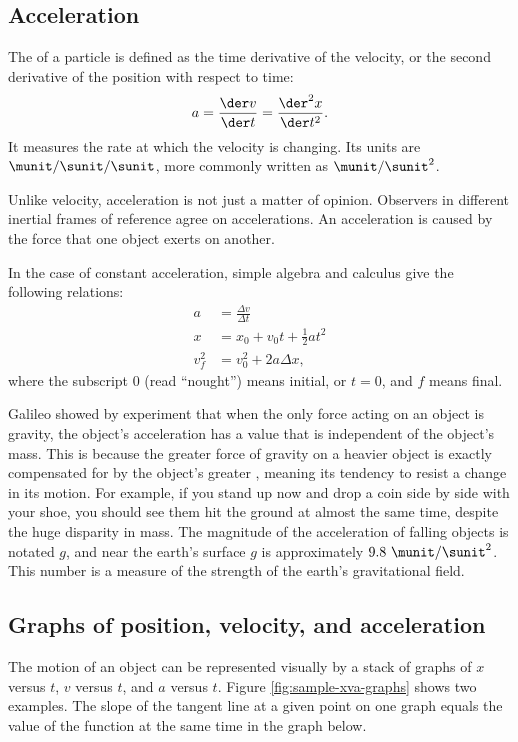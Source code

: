 \subsection{Acceleration}
The 
of a particle is defined as the time derivative of the velocity, or
the second derivative of the position with respect to time:
\begin{equation}
  a = \frac{\der v}{\der t} = \frac{\der^2 x}{\der t^2}.
\end{equation}
It measures the rate at which the velocity is changing.
Its units are $\munit/\sunit/\sunit$, more commonly written as $\munit/\sunit^2$.

Unlike velocity, acceleration is not just a matter of opinion.
Observers in different inertial frames of reference agree on accelerations.
An acceleration is caused by the force that one object exerts on another.

In the case of constant acceleration, simple algebra and calculus give the following relations:
\begin{align}
  a &= \frac{\Delta v}{\Delta t} \\
  x &= x_0+v_0t+\frac{1}{2}at^2 \\
  v_f^2 &= v_0^2 + 2a\Delta x,
\end{align}
where the subscript $0$ (read ``nought'') means initial, or $t=0$, and
$f$ means final.

Galileo showed by experiment
that when the only force acting on an object is gravity, the object's acceleration
has a value that is independent of the object's mass. This is because the greater
force of gravity on a heavier object is exactly compensated for by the object's
greater , meaning its tendency to resist a change in its motion.
For example, if you stand up now and drop a coin side by side with your shoe, you
should see them hit the ground at almost the same time, despite the huge disparity
in mass. The magnitude of the acceleration of falling objects is notated 
$g$, and near the earth's
surface $g$ is approximately $9.8\ \munit/\sunit^2$. This number is a measure of
the strength of the earth's gravitational field.

\subsection{Graphs of position, velocity, and acceleration}

The motion of an object can be represented visually by a stack of graphs
of $x$ versus $t$, $v$ versus $t$, and $a$ versus $t$.
Figure \ref{fig:sample-xva-graphs} shows two examples. The slope of the tangent
line at a given point on one graph equals the value of the function at the
same time in the graph below.

